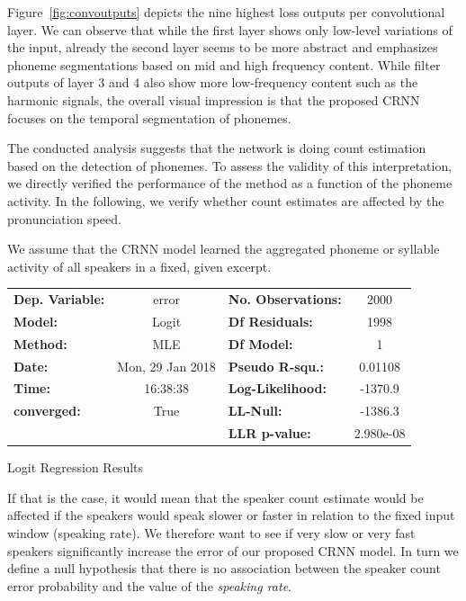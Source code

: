Figure~\ref{fig:convoutputs} depicts the nine highest loss outputs per convolutional layer.
We can observe that while the first layer shows only low-level variations of the input, already the second layer seems to be more abstract and emphasizes phoneme segmentations based on mid and high frequency content.
While filter outputs of layer 3 and 4 also show more low-frequency content such as the harmonic signals, the overall visual impression is that the proposed CRNN focuses on the temporal segmentation of phonemes.\par

The conducted analysis suggests that the network is doing count estimation based on the detection of phonemes. To assess the validity of this interpretation, we directly verified the performance of the method as a function of the phoneme activity. In the following, we verify whether count estimates are affected by the pronunciation speed.\par

We assume that the CRNN model learned the aggregated phoneme or syllable activity of all speakers in a fixed, given excerpt.

\label{Binary Logit Regression}\begin{center}
\begin{tabular}{lclc}
\toprule
\textbf{Dep. Variable:} &      error         & \textbf{  No. Observations:  } &     2000   \\
\textbf{Model:}         &      Logit       & \textbf{  Df Residuals:      } &     1998   \\
\textbf{Method:}        &       MLE        & \textbf{  Df Model:          } &        1   \\
\textbf{Date:}          & Mon, 29 Jan 2018 & \textbf{  Pseudo R-squ.:     } &  0.01108   \\
\textbf{Time:}          &     16:38:38     & \textbf{  Log-Likelihood:    } &   -1370.9  \\
\textbf{converged:}     &       True       & \textbf{  LL-Null:           } &   -1386.3  \\
\textbf{ }              &                  & \textbf{  LLR p-value:       } & 2.980e-08  \\
\bottomrule
\end{tabular}
\caption{Logit Regression Results}
\end{center}

If that is the case, it would mean that the speaker count estimate would be affected if the speakers would speak slower or faster in relation to the fixed input window (speaking rate).
We therefore want to see if very slow or very fast speakers significantly increase the error of our proposed CRNN model.
In turn we define a null hypothesis that there is no association between the speaker count error probability and the value of the \emph{speaking rate}.\par

